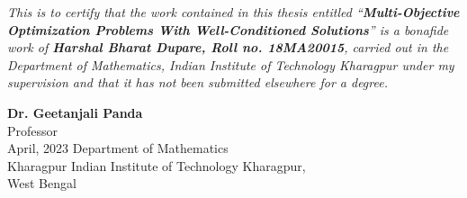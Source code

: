 % 
%  
\begin{Certificate}

\textit{This is to certify that the work contained in this thesis entitled ``\textbf{Multi-Objective Optimization Problems With Well-Conditioned Solutions}'' is a bonafide work of \textbf{Harshal Bharat Dupare, Roll no. 18MA20015}, carried out in the Department of Mathematics, Indian Institute of Technology Kharagpur under my supervision and that it has not been submitted elsewhere for a degree.}\\
\vspace*{1in}
\begin{flushright}
\vspace*{1in}
\textbf{Dr. Geetanjali Panda}\\
Professor\\
April, 2023 \hfill Department of Mathematics\\
Kharagpur \hfill Indian Institute of Technology Kharagpur,\\
West Bengal
\end{flushright}
\end{Certificate}

